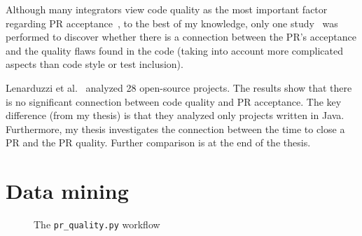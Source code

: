 \documentclass[digital,oneside,oldtable,nolof,nolot,nocover]{fithesis4}
\begin{document}
Although many integrators view code quality as the most important factor
regarding PR acceptance~\cite{integrator}, to the best of my knowledge, only
one study~\cite{quality} was performed to discover whether there is a
connection between the PR's acceptance and the quality flaws found in the
code (taking into account more complicated aspects than code style or test
inclusion).

Lenarduzzi et al.~\cite{quality} analyzed 28 open-source projects. The results show that
there is no significant connection between code quality and PR acceptance.
The key difference (from my thesis) is that they analyzed only projects written
in Java. Furthermore, my thesis investigates the connection between the time to close a
PR and the PR quality. Further comparison is at the end of the thesis.
\chapter{Data mining}
\label{sec:orgf8b1f22}
\begin{figure}[H]\centering
\begin{munibox}[left=5pt,right=5pt,top=5pt,bottom=5pt]
\end{munibox}
\caption{The \texttt{pr\_quality.py} workflow}\label{fig:mining_workflow}
\end{figure}
\end{document}
